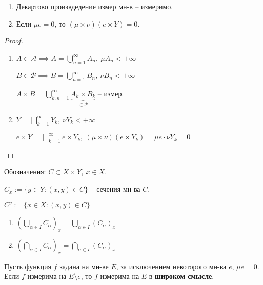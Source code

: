 \begin{properties}
    \begin{enumerate}
        \item Декартово произвдедение измер мн-в -- измеримо.
        \item Если $\mu e = 0$, то $(\mu \times \nu)(e \times Y) = 0$.
    \end{enumerate}
\end{properties}
\begin{proof}
    \begin{enumerate}
        \item {
            $A \in \mathcal{A} \implies A = \bigcup_{n=1}^{\infty} A_n, \ \mu A_n < +\infty$

            $B \in \mathcal{B} \implies B = \bigcup_{n=1}^{\infty} B_n, \ \nu B_n < +\infty$

            $A \times B = \bigcup_{k, n = 1}^{\infty} \underbrace{A_k \times B_k}_{\in \mathcal{P}}$ -- измер.
        }
        \item {
            $Y = \bigsqcup_{k=1}^{\infty} Y_k, \ \nu Y_k < +\infty$

            $e \times Y = \bigsqcup_{k=1}^{\infty} e \times Y_k, \ (\mu \times \nu) (e \times Y_k) = \mu e \cdot \nu Y_k = 0$
        }
    \end{enumerate}
\end{proof}

\begin{remark}
    Обозначения: $C \subset X \times Y, \ x \in X$.

    $C_x := \{ y \in Y: (x, y) \in C \}$ -- сечения мн-ва $C$.

    $C^y := \{ x \in X: (x, y) \in C \}$

\end{remark} 
\begin{consequence}
    \begin{enumerate}
        \item {
            $\left(\bigcup_{\alpha \in I} C_{\alpha}\right)_x = \bigcup_{\alpha \in I} (C_{\alpha})_x$
        }
        \item {
            $\left( \bigcap_{\alpha \in I} C_{\alpha} \right)_x = \bigcap_{\alpha \in I} (C_{\alpha})_x$
        }
    \end{enumerate}
\end{consequence}

\begin{definition}
    Пусть функция $f$ задана на мн-ве $E$, за исключением некоторого мн-ва $e$, $\mu e  = 0$. Если $f$ измерима на $E \setminus e$, то $f$ измерима на $E$ в \textbf{широком смысле}.
\end{definition}

